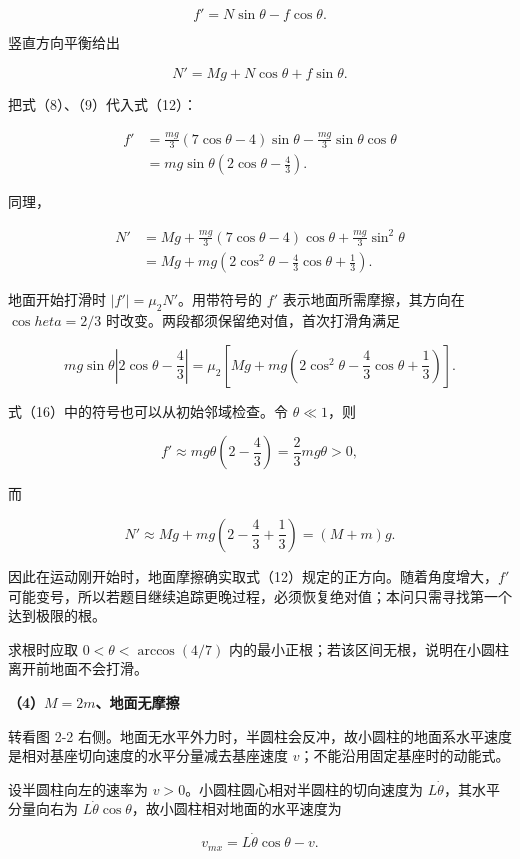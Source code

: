 \documentclass[12pt,a4paper,UTF8]{ctexart}
\begin{document}
\[f'=N\sin\theta-f\cos\theta. \tag{12}\]

竖直方向平衡给出

\[N'=Mg+N\cos\theta+f\sin\theta. \tag{13}\]

把式（8）、（9）代入式（12）：

\[\begin{aligned}
f'
&=\frac{mg}{3}(7\cos\theta-4)\sin\theta
-\frac{mg}{3}\sin\theta\cos\theta\\
&=mg\sin\theta\left(2\cos\theta-\frac43\right).
\end{aligned} \tag{14}\]

同理，

\[\begin{aligned}
N'
&=Mg+\frac{mg}{3}(7\cos\theta-4)\cos\theta
+\frac{mg}{3}\sin^2\theta\\
&=Mg+mg\left(2\cos^2\theta-\frac43\cos\theta+\frac13\right).
\end{aligned} \tag{15}\]

地面开始打滑时 \(|f'|=\mu_2N'\)。用带符号的 \(f'\)
表示地面所需摩擦，其方向在 \(\cos   heta=2/3\)
时改变。两段都须保留绝对值，首次打滑角满足

\[\boxed{
mg\sin\theta\left|2\cos\theta-\frac43\right|
=\mu_2\left[Mg+mg\left(2\cos^2\theta-\frac43\cos\theta+\frac13\right)\right]
}. \tag{16}\]

式（16）中的符号也可以从初始邻域检查。令 \(\theta\ll1\)，则

\[f'\approx mg\theta\left(2-\frac43\right)
=\frac23mg\theta>0,\]

而

\[N'\approx Mg+mg\left(2-\frac43+\frac13\right)
=(M+m)g.\]

因此在运动刚开始时，地面摩擦确实取式（12）规定的正方向。随着角度增大，\(f'\)
可能变号，所以若题目继续追踪更晚过程，必须恢复绝对值；本问只需寻找第一个达到极限的根。

求根时应取 \(0<\theta<\arccos(4/7)\)
内的最小正根；若该区间无根，说明在小圆柱离开前地面不会打滑。

\textbf{（4）\(M=2m\)、地面无摩擦}

转看图 2-2
右侧。地面无水平外力时，半圆柱会反冲，故小圆柱的地面系水平速度是相对基座切向速度的水平分量减去基座速度
\(v\)；不能沿用固定基座时的动能式。

设半圆柱向左的速率为 \(v>0\)。小圆柱圆心相对半圆柱的切向速度为
\(L\dot\theta\)，其水平分量向右为
\(L\dot\theta\cos\theta\)，故小圆柱相对地面的水平速度为

\[v_{mx}=L\dot\theta\cos\theta-v.\]
\end{document}
